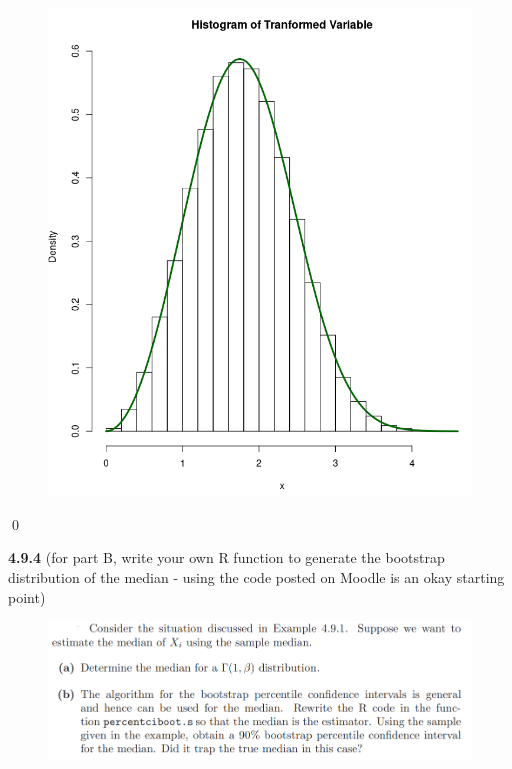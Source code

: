 \documentclass{book}
\theoremstyle{definition}
\begin{document}
\newpage

\begin{figure}[!htb]
	\centering
	\includegraphics[scale=0.5]{weibull}
\end{figure}\qed























\newpage
\noindent\textbf{4.9.4} (for part B, write your own R function to generate the bootstrap distribution of the median -
using the code posted on Moodle is an okay starting point)

\begin{figure}[!htb]
	\centering
	\includegraphics[scale=0.5]{494}
\end{figure}
\end{document}
